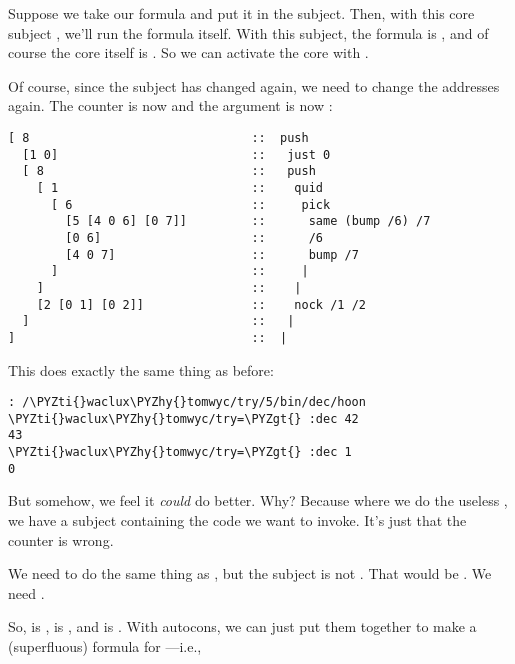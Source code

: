 Suppose we take our  formula and put it in the subject.  Then,
with this core subject , we'll run
the formula itself.  With this subject, the formula is , and
of course the core itself is .  So we can activate the core
with \kode{[2 [0 1] [0 2]]}.

Of course, since the subject has changed again, we need to change
the addresses again.  The counter is now  and the argument
is now :

\begin{framed_shaded}
\begin{Verbatim}[fontsize=\relsize{-2.5},fontseries=b,commandchars=\\\{\}]
[ 8                               ::  push
  [1 0]                           ::   just 0
  [ 8                             ::   push
    [ 1                           ::    quid
      [ 6                         ::     pick
        [5 [4 0 6] [0 7]]         ::      same (bump /6) /7
        [0 6]                     ::      /6
        [4 0 7]                   ::      bump /7
      ]                           ::     |
    ]                             ::    |
    [2 [0 1] [0 2]]               ::    nock /1 /2
  ]                               ::   |
]                                 ::  |
\end{Verbatim}
\end{framed_shaded}
This does exactly the same thing as before:

\begin{framed_shaded}
\begin{Verbatim}[fontsize=\relsize{-2.5},fontseries=b,commandchars=\\\{\}]
: /\PYZti{}waclux\PYZhy{}tomwyc/try/5/bin/dec/hoon
\PYZti{}waclux\PYZhy{}tomwyc/try=\PYZgt{} :dec 42
43
\PYZti{}waclux\PYZhy{}tomwyc/try=\PYZgt{} :dec 1
0
\end{Verbatim}
\end{framed_shaded}
But somehow, we feel it \emph{could} do better.  Why?  Because where
we do the useless \kode{[4 0 7]}, we have a subject containing the
code we want to invoke.  It's just that the counter is wrong.

We need to do the same thing as \kode{[2 [0 1] [0 2]}, but the subject
is not \kode{[0 1]}.  That would be .  We
need .

So,  is \kode{[0 2]},  is \kode{[0 6]}, and  is
\kode{[0 7]}.  With autocons, we can just put them together to make a
(superfluous) formula for ---i.e.,

